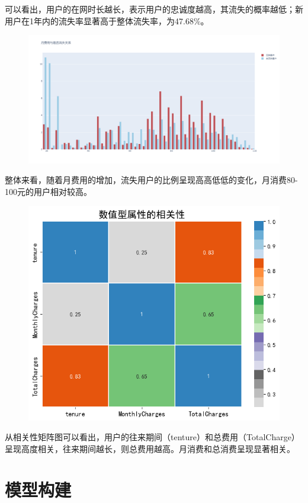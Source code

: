 \documentclass{article}
\begin{document}
可以看出，用户的在网时长越长，表示用户的忠诚度越高，其流失的概率越低；新用户在1年内的流失率显著高于整体流失率，为47.68\%。
\begin{figure}[H]
	\centering
	\includegraphics[width=\textwidth]{./img/t6.png}
\end{figure}
整体来看，随着月费用的增加，流失用户的比例呈现高高低低的变化，月消费80-100元的用户相对较高。
\begin{figure}[H]
	\centering
	\includegraphics[width=\textwidth]{./img/t7.png}
\end{figure}
从相关性矩阵图可以看出，用户的往来期间（tenture）和总费用（TotalCharge）呈现高度相关，往来期间越长，则总费用越高。月消费和总消费呈现显著相关。

\section{模型构建}
\end{document}
